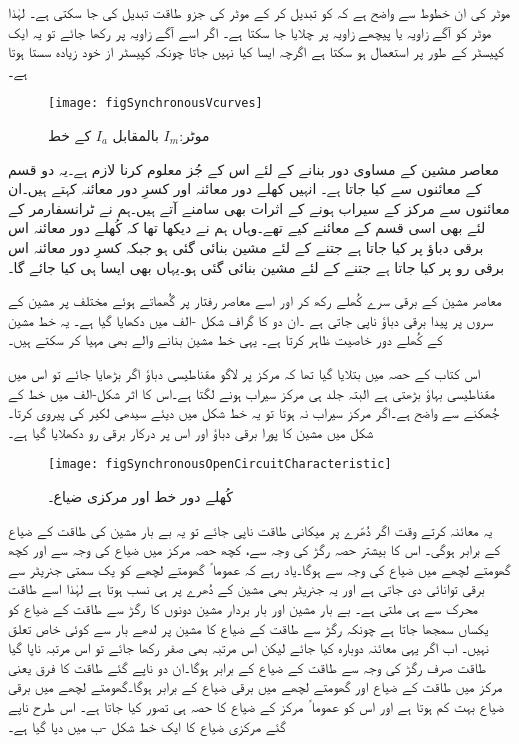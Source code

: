 موٹر کی ان خطوط سے واضح ہے کہ  کو تبدیل کر کے موٹر کی جزو طاقت تبدیل کی جا سکتی ہے۔ لہٰذا موٹر کو آگے زاویہ یا پیچھے زاویہ  پر چلایا جا سکتا ہے۔ اگر اسے آگے زاویہ پر رکھا جائے تو یہ ایک کپیسٹر  کے طور پر استعمال ہو سکتا ہے اگرچہ ایسا کیا نہیں جاتا چونکہ کپیسٹر از خود  زیادہ سستا ہوتا ہے۔ 
\begin{figure}
\centering
\texttt{[image: figSynchronousVcurves]}
\caption{موٹر:$I_{m}$ بالمقابل $I_a$ کے خط}
\label{شکل_معاصر_برقی_رو_بالمقابل_برقی_دباو}
\end{figure}
معاصر مشین کے مساوی دور بنانے کے لئے اس کے جُز معلوم کرنا لازم ہے۔یہ دو قسم کے معائنوں سے کیا جاتا ہے۔ انہیں کھلے دور معائنہ اور کسرِ دور معائنہ کہتے ہیں۔ان معائنوں سے مرکز کے سیراب ہونے کے اثرات بھی سامنے آتے ہیں۔ہم نے ٹرانسفارمر کے لئے بھی اسی قسم کے معائنے کیے تھے۔وہاں ہم نے دیکھا تھا کہ کُھلے دور معائنہ اس برقی دباؤ پر کیا جاتا ہے جتنے کے لئے مشین بنائی گئی ہو جبکہ کسرِ دور معائنہ اس برقی رو پر کیا جاتا ہے جتنے کے لئے مشین بنائی گئی ہو۔یہاں بھی ایسا ہی کیا جائے گا۔ 

معاصر مشین کے برقی سرے کُھلے رکھ کر اور اسے معاصر رفتار پر گُھماتے ہوئے مختلف  پر  مشین کے سروں پر پیدا برقی دباؤ  ناپی جاتی ہے ۔ان دو کا گراف شکل -الف میں دکھایا گیا ہے۔ یہ خط مشین کے کُھلے دور خاصیت ظاہر کرتا ہے۔ یہی خط مشین بنانے والے بھی مہیا کر سکتے ہیں۔

اس کتاب کے حصہ  میں بتلایا گیا تھا کہ مرکز پر لاگو مقناطیسی دباؤ اگر بڑھایا جائے تو اس میں مقناطیسی بہاؤ بڑھتی ہے البتہ جلد ہی مرکز سیراب ہونے لگتا ہے۔اس کا اثر شکل-الف میں خط کے جُھکنے سے واضح ہے۔اگر مرکز سیراب نہ ہوتا تو یہ خط شکل میں دیئے سیدھی لکیر کی پیروی کرتا۔شکل میں مشین کا پورا برقی دباؤ اور اس  پر درکار برقی رو  دکھلایا گیا ہے۔
\begin{figure}
\centering
\texttt{[image: figSynchronousOpenCircuitCharacteristic]}
\caption{کُھلے دور خط اور مرکزی ضیاع۔}
\label{شکل_معاصر_کھلے_دور_خط}
\end{figure}

یہ معائنہ کرتے وقت اگر دُھّرے پر میکانی طاقت  ناپی جائے تو یہ بے بار مشین کی طاقت کے ضیاع کے برابر ہوگی۔ اس کا بیشتر حصہ رگڑ کی وجہ سے، کچھ حصہ مرکز میں ضیاع کی وجہ سے اور کچھ گھومتے لچھے میں ضیاع کی وجہ سے ہوگا۔یاد رہے کہ عموما ً گھومتے لچھے کو یک سمتی جنریٹر سے برقی توانائی دی جاتی ہے اور یہ جنریٹر بھی مشین کے دُھرے پر ہی نسب ہوتا ہے لہٰذا اسے طاقت محرک سے ہی ملتی ہے۔ بے بار مشین اور بار بردار مشین دونوں کا رگڑ سے طاقت کے ضیاع کو یکساں سمجھا جاتا ہے چونکہ رگڑ سے طاقت کے ضیاع کا مشین پر لدھے بار سے کوئی خاص تعلق نہیں۔ اب اگر یہی معائنہ دوبارہ کیا جائے لیکن اس مرتبہ  بھی صفر رکھا جائے تو اس مرتبہ ناپا گیا طاقت  صرف رگڑ کی وجہ سے طاقت کے ضیاع کے برابر ہوگا۔ان دو ناپے گئے طاقت کا فرق یعنی  مرکز میں طاقت کے ضیاع  اور گھومتے لچھے میں برقی ضیاع کے برابر ہوگا۔گھومتے لچھے میں برقی ضیاع بہت کم ہوتا ہے اور اس کو عموما ً مرکز کے ضیاع کا حصہ ہی تصور کیا جاتا ہے۔ اس طرح ناپے گئے مرکزی ضیاع کا ایک خط شکل  -ب میں دیا گیا ہے۔

